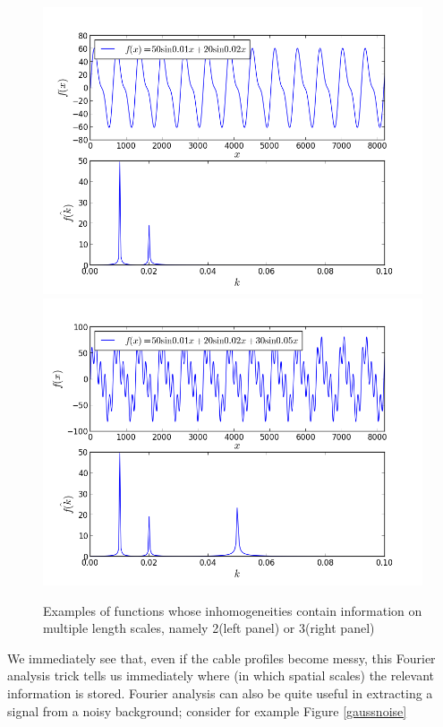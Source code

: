 \begin{figure}
\begin{center}
\includegraphics[scale=0.4]{Fourier/2component.png}
\includegraphics[scale=0.4]{Fourier/3component.png}
\label{}
\end{center}
\caption{Examples of functions whose inhomogeneities contain information on multiple length scales, namely 2(left panel) or 3(right panel)}
\label{fourier23d}
\end{figure}
We immediately see that, even if the cable profiles become messy, this Fourier analysis trick tells us immediately where (in which spatial scales) the relevant information is stored. Fourier analysis can also be quite useful in extracting a signal from a noisy background; consider for example Figure \ref{gaussnoise}

